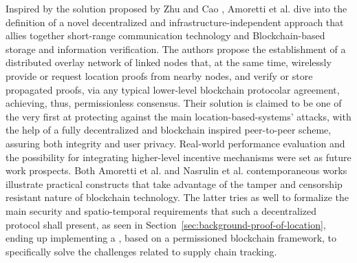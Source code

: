 Inspired by the solution proposed by Zhu and Cao \cite{zhu2011applaus}, Amoretti et al. \cite{amoretti2018blockchain} dive into the definition of a novel decentralized and infrastructure-independent approach that allies together short-range communication technology and Blockchain-based storage and information verification. The authors propose the establishment of a distributed overlay network of linked nodes that, at the same time, wirelessly provide or request location proofs from nearby nodes, and verify or store propagated proofs, via any typical lower-level blockchain protocolar agreement, achieving, thus, permissionless consensus. Their solution is claimed to be one of the very first at protecting against the main location-based-systems' attacks, with the help of a fully decentralized and blockchain inspired peer-to-peer scheme, assuring both integrity and user privacy. Real-world performance evaluation and the possibility for integrating higher-level incentive mechanisms were set as future work prospects. Both Amoretti et al. \cite{amoretti2018blockchain} and Nasrulin et al. \cite{nasrulin2018robust} contemporaneous works illustrate practical constructs that take advantage of the tamper and censorship resistant nature of blockchain technology. The latter tries as well to formalize the main security and spatio-temporal requirements that such a decentralized \pol{} protocol shall present, as seen in Section~\ref{sec:background-proof-of-location}, ending up implementing a \poc{}, based on a permissioned blockchain framework, to specifically solve the challenges related to supply chain tracking.

